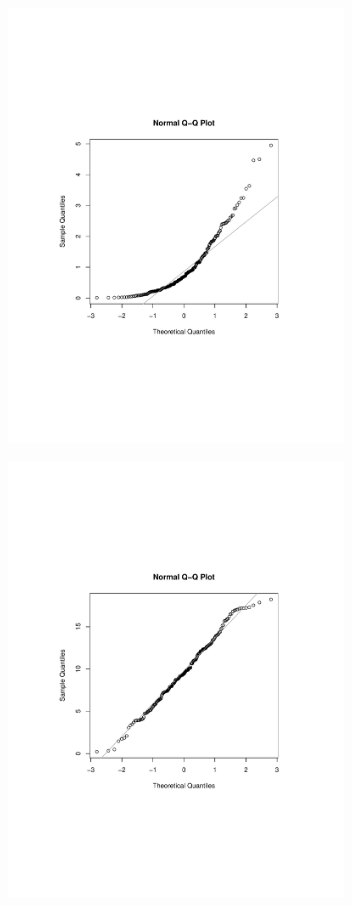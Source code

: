 \documentclass[aspectratio=169]{beamer}
\begin{document}
\begin{frame}
\includegraphics[width=3.5in]{qqnorm2.pdf}
\end{frame}

\begin{frame}
\includegraphics[width=3.5in]{qqnorm3.pdf}
\end{frame}
\end{document}
